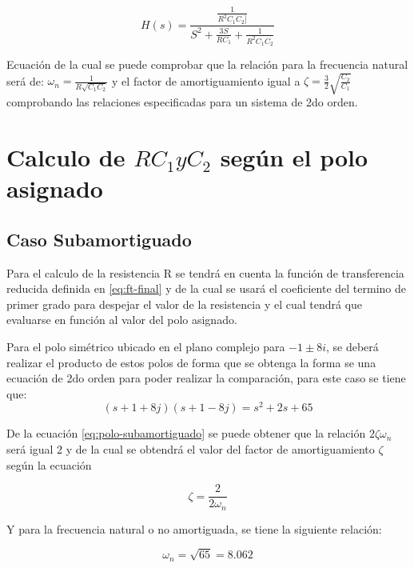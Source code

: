 \documentclass[conference]{IEEEtran}
\begin{document}
	\begin{equation}
		H(s) = \frac{ \frac{1}{R^2C_1C_2]} }{ S^2 + \frac{3S}{RC_1} + \frac{1}{R^2C_1C_2}}
		\label{eq:ft-final}
	\end{equation}
	
	Ecuación de la cual se puede comprobar que la relación para la frecuencia natural será de: $\omega_n =\frac{1}{R \sqrt{C_1 C_2}}$ y el factor de amortiguamiento igual a $\zeta = \frac{3}{2} \sqrt{\frac{C_2}{C_1}}$ comprobando las relaciones especificadas para un sistema de 2do orden.
	
	\section{Calculo de $R C_1 y C_2$ según el polo asignado}
	\subsection{Caso Subamortiguado}
	
	Para el calculo de la resistencia R se tendrá en cuenta la función de transferencia reducida definida en \ref{eq:ft-final} y de la cual se usará el coeficiente del termino de primer grado para despejar el valor de la resistencia y el cual tendrá que evaluarse en función al valor del polo asignado.
	
	Para el polo simétrico ubicado en el plano complejo para $-1 \pm 8i$, se deberá realizar el producto de estos polos de forma que se obtenga la forma se una ecuación de 2do orden para poder realizar la comparación, para este caso se tiene que:
	\begin{equation}
		(s + 1 + 8j)(s + 1 - 8j) = s^2 + 2s + 65
		\label{eq:polo-subamortiguado}
	\end{equation}
	
	De la ecuación \ref{eq:polo-subamortiguado} se puede obtener que la relación $2\zeta \omega_n$ será igual 2 y de la cual se obtendrá el valor del factor de amortiguamiento $\zeta$ según la ecuación
	
	\begin{equation}
		\zeta = \frac{2}{2 \omega_n}
		\label{eq:factor-amortiguamiento}
	\end{equation}
	
	Y para la frecuencia natural o no amortiguada, se tiene la siguiente relación:
	
	\begin{equation}
		\omega_n = \sqrt{65} = 8.062
		\label{eq:frecuencia-natural}
	\end{equation}
	
\end{document}
